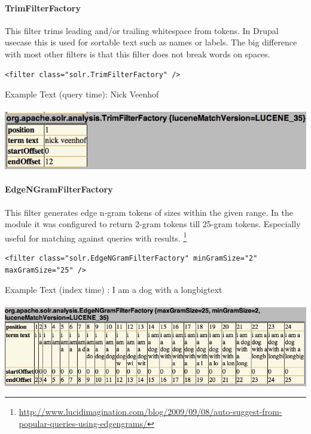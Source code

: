 \paragraph{TrimFilterFactory} This filter trims leading and/or trailing whitespace from tokens. In Drupal usecase this is used for sortable text such as names or labels. The big difference with most other filters is that this filter does not break words on spaces.
\begin{verbatim}
<filter class="solr.TrimFilterFactory" />
\end{verbatim}
Example Text (query time): Nick Veenhof
\mbox{} \\
\mbox{} \\
\includegraphics[width=\textwidth]{images/trimfilterfactory.jpg}

\paragraph{EdgeNGramFilterFactory} This filter generates edge n-gram tokens of sizes within the given range. In the module it was configured to return 2-gram tokens till 25-gram tokens. Especially useful for matching against queries with results. \footnote{\url{http://www.lucidimagination.com/blog/2009/09/08/auto-suggest-from-popular-queries-using-edgengrams/}}
\begin{verbatim}
<filter class="solr.EdgeNGramFilterFactory" minGramSize="2" maxGramSize="25" />
\end{verbatim}
Example Text (index time) : I am a dog with a longbigtext
\mbox{} \\
\mbox{} \\
\includegraphics[width=\textwidth]{images/edgengramfilterfactory.jpg}

